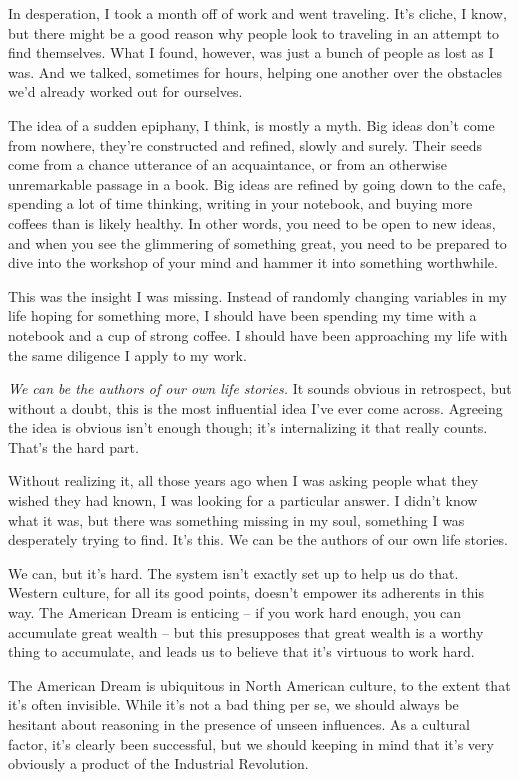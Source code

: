 \documentclass[]{book}
\begin{document}
In desperation, I took a month off of work and went traveling. It's cliche, I
know, but there might be a good reason why people look to traveling in an
attempt to find themselves. What I found, however, was just a bunch of people as
lost as I was. And we talked, sometimes for hours, helping one another over the
obstacles we'd already worked out for ourselves.

The idea of a sudden epiphany, I think, is mostly a myth. Big ideas don't come
from nowhere, they're constructed and refined, slowly and surely. Their seeds
come from a chance utterance of an acquaintance, or from an otherwise
unremarkable passage in a book. Big ideas are refined by going down to the cafe,
spending a lot of time thinking, writing in your notebook, and buying more
coffees than is likely healthy.  In other words, you need to be open to new
ideas, and when you see the glimmering of something great, you need to be
prepared to dive into the workshop of your mind and hammer it into something
worthwhile.

This was the insight I was missing. Instead of randomly changing variables in my
life hoping for something more, I should have been spending my time with a
notebook and a cup of strong coffee. I should have been approaching my life with
the same diligence I apply to my work.

\emph{We can be the authors of our own life stories.} It sounds obvious in
retrospect, but without a doubt, this is the most influential idea I've ever
come across. Agreeing the idea is obvious isn't enough though; it's
internalizing it that really counts. That's the hard part.

Without realizing it, all those years ago when I was asking people what they
wished they had known, I was looking for a particular answer. I didn't know what
it was, but there was something missing in my soul, something I was desperately
trying to find. It's this. We can be the authors of our own life stories.

We can, but it's hard. The system isn't exactly set up to help us do that.
Western culture, for all its good points, doesn't empower its adherents in this
way.  The American Dream is enticing -- if you work hard
enough, you can accumulate great wealth -- but this presupposes that great
wealth is a worthy thing to accumulate, and leads us to believe that it's
virtuous to work hard.

The American Dream is ubiquitous in North American culture, to the extent that
it's often invisible. While it's not a bad thing per se, we should
always be hesitant about reasoning in the presence of unseen influences. As a
cultural factor, it's clearly been successful, but we should keeping in mind
that it's very obviously a product of the Industrial Revolution.
\end{document}
